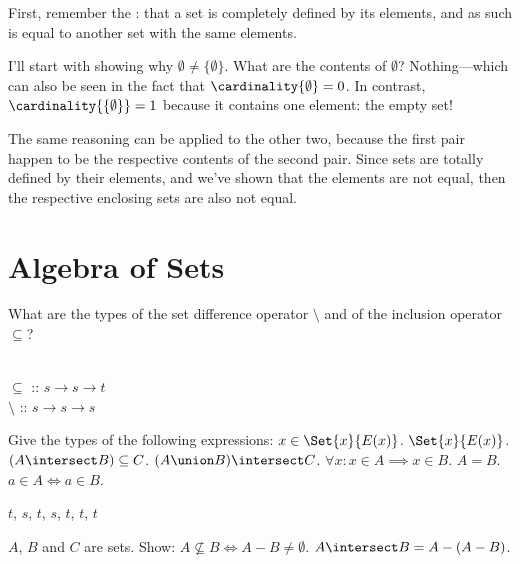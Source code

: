 \documentclass{report}
\begin{document}
\begin{Answer}
  First, remember the : that a set
  is completely defined by its elements, and as such is equal to
  another set with the same elements.
	
  I'll start with showing why $\emptyset \neq \{\emptyset\}$. What are
  the contents of $\emptyset$? Nothing---which can also be seen in the
  fact that $\cardinality{\emptyset} = 0$.  In contrast,
  $\cardinality{ \{ \emptyset \} } = 1$ because it contains one
  element: the empty set!

  The same reasoning can be applied to the other two, because the
  first pair happen to be the respective contents of the second
  pair. Since sets are totally defined by their elements, and we've
  shown that the elements are not equal, then the respective enclosing
  sets are also not equal.
\end{Answer}
\section{Algebra of Sets}

\begin{Exercise} [number=13]
  What are the types of the set difference operator $\setminus$ and of the inclusion operator $\subseteq$?
\end{Exercise}

\begin{Answer}

  \\$\subseteq$ :: $s \rightarrow s \rightarrow t$\\
  $\setminus$ :: $s \rightarrow s \rightarrow s$
\end{Answer}


\begin{Exercise} [number=14]
  Give the types of the following expressions:
  \Question $x \in \Set{x}{E(x)}$.
  \Question $\Set{x}{E(x)}$.
  \Question $(A \intersect B) \subseteq C$.
  \Question $(A \union B) \intersect C$.
  \Question $\forall{x} \colon x \in A \implies x \in B$.
  \Question $A=B$.
  \Question $a \in A \iff a \in B$.
\end{Exercise}

\begin{Answer}
$t$, $s$, $t$, $s$, $t$, $t$, $t$
\end{Answer}

\begin{Exercise} [number=17]
  $A$, $B$ and $C$ are sets. Show:
  \Question $A \nsubseteq B \iff A - B \neq \emptyset$.
  \Question $A \intersect B = A - (A - B)$.
\end{Exercise}
\end{document}
